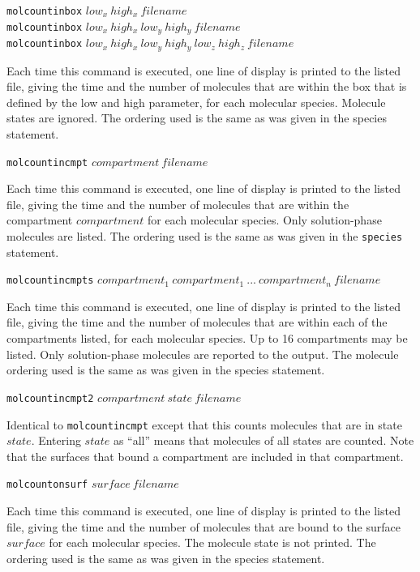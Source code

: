 \documentclass {scrbook}
\newcommand {\ttt} {\texttt}
\begin{document}
\begin{description}
\item{\ttt{molcountinbox} $low_x\ high_x\ filename$\\
\ttt{molcountinbox} $low_x\ high_x\ low_y\ high_y\ filename$\\
\ttt{molcountinbox} $low_x\ high_x\ low_y\ high_y\ low_z\ high_z\ filename$}

Each time this command is executed, one line of display is printed to the listed file, giving the time and the number of molecules that are within the box that is defined by the low and high parameter, for each molecular species. Molecule states are ignored. The ordering used is the same as was given in the species statement.

\item{\ttt{molcountincmpt} $compartment\ filename$}

Each time this command is executed, one line of display is printed to the listed file, giving the time and the number of molecules that are within the compartment $compartment$ for each molecular species. Only solution-phase molecules are listed. The ordering used is the same as was given in the \ttt{species} statement.

\item{\ttt{molcountincmpts} $compartment_1\ compartment_1\ ...\ compartment_n\ filename$}

Each time this command is executed, one line of display is printed to the listed file, giving the time and the number of molecules that are within each of the compartments listed, for each molecular species. Up to 16 compartments may be listed. Only solution-phase molecules are reported to the output. The molecule ordering used is the same as was given in the species statement.

\item{\ttt{molcountincmpt2} $compartment\ state\ filename$}

Identical to \ttt{molcountincmpt} except that this counts molecules that are in state $state$. Entering $state$ as ``all'' means that molecules of all states are counted. Note that the surfaces that bound a compartment are included in that compartment.

\item{\ttt{molcountonsurf} $surface\ filename$}

Each time this command is executed, one line of display is printed to the listed file, giving the time and the number of molecules that are bound to the surface $surface$ for each molecular species. The molecule state is not printed. The ordering used is the same as was given in the species statement.


\end{description}
\end{document}
